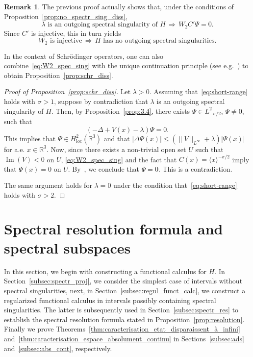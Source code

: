 \documentclass[10pt]{amsart}
\theoremstyle{definition}\newtheorem{defi}[theo]{Definition}\newtheorem{rema}[theo]{Remark}\newtheorem{exam}[theo]{Example}\newtheorem{exem}[theo]{Example}\newtheorem{nota}[theo]{Notation}
\newcommand{\R}{\mathbb{R}}
\DeclareMathOperator{\im}{Im}
\begin{document}
\begin{rema}
The previous proof actually shows that, under the conditions of Proposition~\ref{prop:no_spectr_sing_diss},
\begin{equation}\label{eq:W2_spec_sing}
\lambda\text{ is an outgoing spectral singularity of }H \, \Rightarrow \, W_2C'\Psi=0.
\end{equation}
Since $C'$ is injective, this in turn yields
\begin{equation*}
W_2\text{ is injective} \, \Rightarrow \, H\text{ has no outgoing spectral singularities}.
\end{equation*}
\end{rema}

In the context of Schr\"odinger operators, one can also combine~\eqref{eq:W2_spec_sing} with the unique continuation principle (see e.g.~\cite[Theorem~XIII.63]{ReSi80_01}) to obtain Proposition~\ref{prop:schr_diss}.

\begin{proof}[Proof of Proposition~\ref{prop:schr_diss}]
Let $\lambda>0$. Assuming that~\eqref{eq:short-range} holds with $\sigma>1$, suppose by contradiction that $\lambda$ is an outgoing spectral singularity of $H$. Then, by Proposition~\ref{prop:3.4}, there exists $\Psi\in L^2_{-\sigma/2}$, $\Psi\neq0$, such that
\begin{equation*}
(-\Delta+V(x)-\lambda)\Psi=0.
\end{equation*}
This implies that $\Psi\in H^2_{\mathrm{loc}}(\R^3)$ and that $|\Delta\Psi(x)|\le (\|V\|_{L^\infty}+\lambda)|\Psi(x)|$ for a.e. $x\in\R^3$. Now, since there exists a non-trivial open set $U$ such that $\im(V)<0$ on $U$, \eqref{eq:W2_spec_sing} and the fact that $C(x)=\langle x\rangle^{-\sigma/2}$ imply that $\Psi(x)=0$ on $U$. By~\cite[Theorem~XIII.63]{ReSi80_01}, we conclude that $\Psi=0$. This is a contradiction.

The same argument holds for $\lambda=0$ under the condition that~\eqref{eq:short-range} holds with $\sigma>2$.
\end{proof}

\section{Spectral resolution formula and spectral subspaces}\label{sec:spectr_res}

In this section, we begin with constructing a functional calculus for $H$. In Section~\ref{subsec:spectr_proj}, we consider the simplest case of intervals without spectral singularities, next, in Section~\ref{subsec:regul_funct_calc}, we construct a regularized functional calculus in intervals possibly containing spectral singularities. The latter is subsequently used in Section~\ref{subsec:spectr_res} to establish the spectral resolution formula stated in Proposition~\ref{prop:resolution}. Finally we prove Theorems~\ref{thm:caracterisation_etat_disparaissent_à_infini} and~\ref{thm:caracterisation_espace_absolument_continu} in Sections~\ref{subsec:ads} and~\ref{subsec:abs_cont}, respectively.
\end{document}
